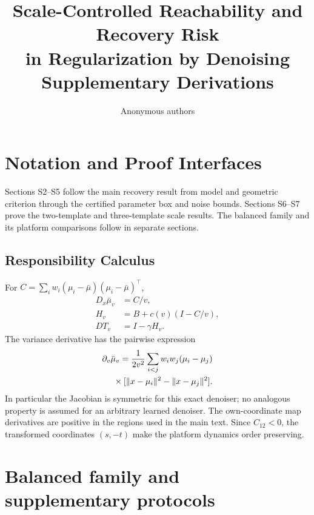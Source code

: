 \documentclass[10pt,twocolumn,letterpaper]{article}
\title{Scale-Controlled Reachability and Recovery Risk\\in Regularization by Denoising\\Supplementary Derivations}
\author{Anonymous authors}
\begin{document}
\maketitle
\section{Notation and Proof Interfaces}
Sections S2--S5 follow the main recovery result from model and
geometric criterion through the certified parameter box and noise bounds.
Sections S6--S7 prove the two-template and three-template scale results.
The balanced family and its platform comparisons follow in separate sections.






\subsection{Responsibility Calculus}
For $C=\sum_iw_i(\mu_i-\bar\mu)(\mu_i-\bar\mu)^\top$,
\begin{align}
D_x\bar\mu_v&=C/v,\\
H_v&=B+c(v)(I-C/v),\\
DT_v&=I-\gamma H_v.
\end{align}
The variance derivative has the pairwise expression
\begin{align}
\partial_v\bar\mu_v={1\over2v^2}\sum_{i<j}w_iw_j(\mu_i-\mu_j)\nonumber\\
{}\times[\lVert x-\mu_i\rVert^2-\lVert x-\mu_j\rVert^2].
\end{align}
In particular the Jacobian is symmetric for this exact denoiser; no analogous property is assumed for an arbitrary learned denoiser. The own-coordinate map derivatives are positive in the regions used in the main text. Since $C_{12}<0$, the transformed coordinates $(s,-t)$ make the platform dynamics order preserving.



\twocolumn





\clearpage
\section{Balanced family and supplementary protocols}\label{sec:balanced_family}

\end{document}
